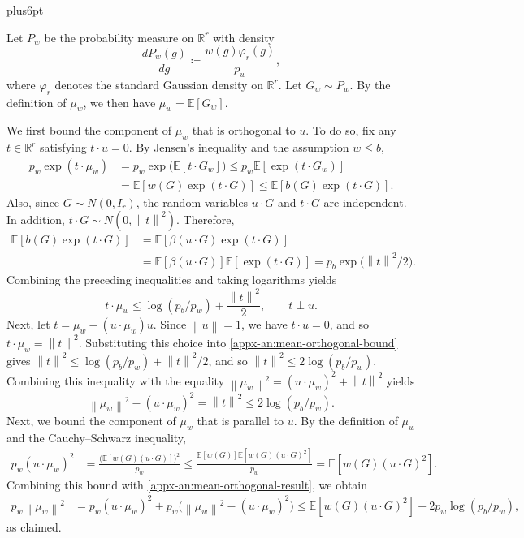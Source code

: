\documentclass[11pt,letterpaper,twoside,leqno]{article}
\makeatletter
\theoremstyle{bookplain}
\theoremstyle{bookremark}
\renewenvironment{proof}[1][\proofname]{\par
  \pushQED{\qed}\normalfont\topsep6pt plus6pt\relax
  \trivlist\item[\hskip\labelsep\bfseries #1\@addpunct{.}]\ignorespaces
}{\popQED\endtrivlist\@endpefalse}
\newcommand{\E}{\mathbb E}
\newcommand{\R}{\mathbb R}
\newcommand{\norm}[1]{\left\lVert#1\right\rVert}
\makeatother
\begin{document}
\begin{proof}
Let $P_w$ be the probability measure on $\R^r$ with density
\[
\frac{d P_w(g)}{dg}\coloneqq \frac{w(g)\varphi_r(g)}{p_w},
\]
where $\varphi_r$ denotes the standard Gaussian density
on $\R^r$. Let $G_w\sim P_w$. By the definition of
$\mu_w$, we then have $\mu_w=\E[G_w]$.

We first bound the component of $\mu_w$ that is orthogonal to $u$. To do so, fix any \(t\in\R^r\) satisfying \(t\cdot u=0\).
By Jensen's inequality and the assumption \(w\le b\),
\begin{align*}
p_w\exp(t\cdot\mu_w)
&=p_w\exp\bigl(\E[t\cdot G_w]\bigr)
\le p_w\E[\exp(t\cdot G_w)]\\
&=\E[w(G)\exp(t\cdot G)]
\le\E[b(G)\exp(t\cdot G)].
\end{align*}
Also, since \(G\sim N(0,I_r)\),
the random variables \(u\cdot G\) and \(t\cdot G\)
are independent. In addition, \(t\cdot G\sim N(0,\norm{t}^2)\). Therefore,
\begin{align*}
\E[b(G)\exp(t\cdot G)]
&=\E[\beta(u\cdot G)\exp(t\cdot G)]\\
&=\E[\beta(u\cdot G)]\E[\exp(t\cdot G)]
=p_b\exp\bigl(\norm{t}^2/2\bigr).
\end{align*}
Combining the preceding inequalities and taking
logarithms yields
\begin{equation}
t\cdot\mu_w
\le \log(p_b/p_w)+\frac{\norm{t}^2}{2},
\qquad t\perp u.
\label{appx-an:mean-orthogonal-bound}
\end{equation}
Next, let $t=\mu_w-(u\cdot\mu_w)u$.
Since \(\norm{u}=1\), we have \(t\cdot u=0\), and so
$ t\cdot\mu_w =\norm{t}^2$.
Substituting this choice into
\eqref{appx-an:mean-orthogonal-bound} gives
$\norm{t}^2 \le \log(p_b/p_w)+\norm{t}^2/2$, and so $\norm{t}^2\leq 2\log(p_b/p_w)$.
Combining this inequality with the equality $\norm{\mu_w}^2 = (u\cdot\mu_w)^2 + \norm{t}^2$ yields
\begin{equation}
\norm{\mu_w}^2-(u\cdot\mu_w)^2
=\norm{t}^2
\le 2\log(p_b/p_w).
\label{appx-an:mean-orthogonal-result}
\end{equation}
Next, we bound the component of $\mu_w$ that is parallel to \(u\). By the definition of \(\mu_w\)
and the Cauchy--Schwarz inequality,
\begin{align*}
p_w(u\cdot\mu_w)^2
&=\frac{\bigl(\E[w(G)(u\cdot G)]\bigr)^2}{p_w}
\le
\frac{\E[w(G)]\E[w(G)(u\cdot G)^2]}{p_w}
=\E[w(G)(u\cdot G)^2].
\end{align*}
Combining this bound with \eqref{appx-an:mean-orthogonal-result},
we obtain
\begin{align*}
p_w\norm{\mu_w}^2
&=p_w(u\cdot\mu_w)^2
 +p_w\bigl(\norm{\mu_w}^2-(u\cdot\mu_w)^2\bigr)
 \le \E[w(G)(u\cdot G)^2]
 +2p_w\log(p_b/p_w),
\end{align*}
as claimed.
\end{proof}
\end{document}
